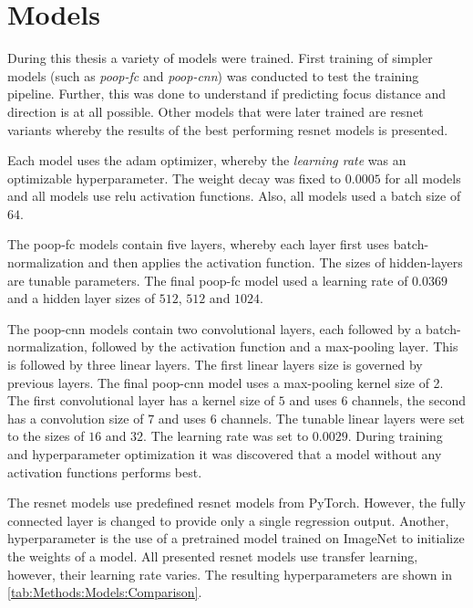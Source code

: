 \section{Models}
\label{sec:Methods:Models}

During this thesis a variety of models were trained. First training of simpler models (such as \emph{\acs{poop}-\acs{fc}} and \emph{\acs{poop}-\acs{cnn}}) was conducted to test the training pipeline. Further, this was done to understand if predicting focus distance and direction is at all possible. Other models that were later trained are \acs{resnet} variants whereby the results of the best performing \acs{resnet} models is presented.

Each model uses the \ac{adam} optimizer, whereby the \emph{learning rate} was an optimizable hyperparameter. The weight decay was fixed to $0.0005$ for all models and all models use \ac{relu} activation functions. Also, all models used a batch size of $64$.

The \acs{poop}-\acs{fc} models contain five layers, whereby each layer first uses batch-normalization and then applies the activation function. The sizes of hidden-layers are tunable parameters. The final \acs{poop}-\acs{fc} model used a learning rate of $0.0369$ and a hidden layer sizes of $512$, $512$ and $1024$.

The \acs{poop}-\acs{cnn} models contain two convolutional layers, each followed by a batch-normalization, followed by the activation function and a max-pooling layer. This is followed by three linear layers. The first linear layers size is governed by previous layers. The final \acs{poop}-\acs{cnn} model uses a max-pooling kernel size of 2. The first convolutional layer has a kernel size of $5$ and uses $6$ channels, the second has a convolution size of $7$ and uses $6$ channels. The tunable linear layers were set to the sizes of $16$ and $32$. The learning rate was set to $0.0029$. During training and hyperparameter optimization it was discovered that a model without any activation functions performs best.

The \ac{resnet} models use predefined \ac{resnet} models from PyTorch. However, the fully connected layer is changed to provide only a single regression output. Another, hyperparameter is the use of a pretrained model trained on ImageNet \cite{deng2009imagenet} to initialize the weights of a model. All presented \ac{resnet} models use transfer learning, however, their learning rate varies. The resulting hyperparameters are shown in \autoref{tab:Methods:Models:Comparison}.

